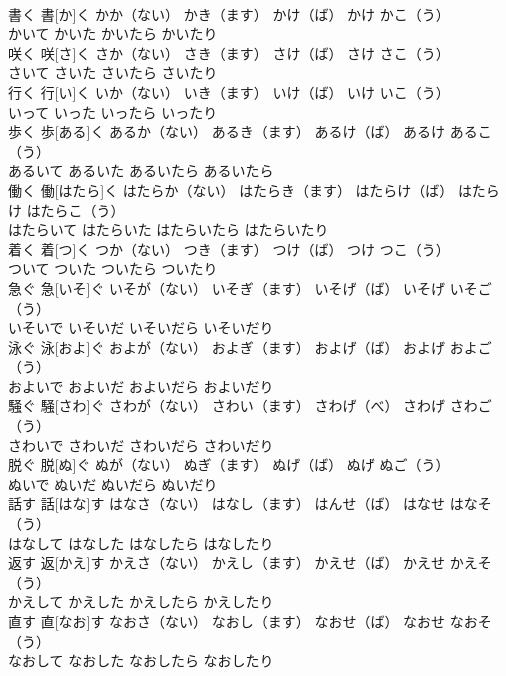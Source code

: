 \documentclass[8pt]{extreport}
\begin{document}
\begin{CJK}{UTF8}{min}
\\	書く	書[か]く	かか（ない）	かき（ます）	かけ（ば）	かけ	かこ（う）	
\\	かいて	かいた	かいたら	かいたり
\\	咲く	咲[さ]く	さか（ない）	さき（ます）	さけ（ば）	さけ	さこ（う）	
\\	さいて	さいた	さいたら	さいたり
\\	行く	行[い]く	いか（ない）	いき（ます）	いけ（ば）	いけ	いこ（う）	
\\	いって	いった	いったら	いったり
\\	歩く	歩[ある]く	あるか（ない）	あるき（ます）	あるけ（ば）	あるけ	あるこ（う）	
\\	あるいて	あるいた	あるいたら	あるいたら
\\	働く	働[はたら]く	はたらか（ない）	はたらき（ます）	はたらけ（ば）	はたらけ	はたらこ（う）	
\\	はたらいて	はたらいた	はたらいたら	はたらいたり
\\	着く	着[つ]く	つか（ない）	つき（ます）	つけ（ば）	つけ	つこ（う）	
\\	ついて	ついた	ついたら	ついたり
\\	急ぐ	急[いそ]ぐ	いそが（ない）	いそぎ（ます）	いそげ（ば）	いそげ	いそご（う）	
\\	いそいで	いそいだ	いそいだら	いそいだり
\\	泳ぐ	泳[およ]ぐ	およが（ない）	およぎ（ます）	およげ（ば）	およげ	およご（う）	
\\	およいで	およいだ	およいだら	およいだり
\\	騒ぐ	騒[さわ]ぐ	さわが（ない）	さわい（ます）	さわげ（べ）	さわげ	さわご（う）	
\\	さわいで	さわいだ	さわいだら	さわいだり
\\	脱ぐ	脱[ぬ]ぐ	ぬが（ない）	ぬぎ（ます）	ぬげ（ば）	ぬげ	ぬご（う）	
\\	ぬいで	ぬいだ	ぬいだら	ぬいだり
\\	話す	話[はな]す	はなさ（ない）	はなし（ます）	はんせ（ば）	はなせ	はなそ（う）	
\\	はなして	はなした	はなしたら	はなしたり
\\	返す	返[かえ]す	かえさ（ない）	かえし（ます）	かえせ（ば）	かえせ	かえそ（う）	
\\	かえして	かえした	かえしたら	かえしたり
\\	直す	直[なお]す	なおさ（ない）	なおし（ます）	なおせ（ば）	なおせ	なおそ（う）	
\\	なおして	なおした	なおしたら	なおしたり

\end{CJK}
\end{document}

